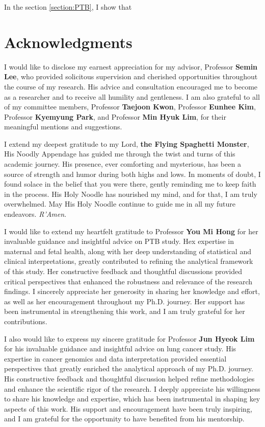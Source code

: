 \documentclass[11pt, a4paper, onecolumn, oneside]{report}
\begin{document}
        In the section \ref{section:PTB}, I show that
        \newpage

    
    
    \clearpage

    \section*{\hfill \Large Acknowledgments \hfill}
        I would like to disclose my earnest appreciation for my advisor, Professor \textbf{Semin Lee}, who provided solicitous supervision and cherished opportunities throughout the course of my research. His advice and consultation encouraged me to become as a researcher and to receive all humility and gentleness. I am also grateful to all of my committee members, Professor \textbf{Taejoon Kwon}, Professor \textbf{Eunhee Kim}, Professor \textbf{Kyemyung Park}, and Professor \textbf{Min Hyuk Lim}, for their meaningful mentions and suggestions.

        I extend my deepest gratitude to my Lord, \textbf{the Flying Spaghetti Monster}, His Noodly Appendage has guided me through the twist and turns of this academic journey. His presence, ever comforting and mysterious, has been a source of strength and humor during both highs and lows. In moments of doubt, I found solace in the belief that you were there, gently reminding me to keep faith in the process. His Holy Noodle has nourished my mind, and for that, I am truly overwhelmed. May His Holy Noodle continue to guide me in all my future endeavors. \textit{R'Amen}.

        I would like to extend my heartfelt gratitude to Professor \textbf{You Mi Hong} for her invaluable guidance and insightful advice on PTB study. Hex expertise in maternal and fetal health, along with her deep understanding of statistical and clinical interpretations, greatly contributed to refining the analytical framework of this study. Her constructive feedback and thoughtful discussions provided critical perspectives that enhanced the robustness and relevance of the research findings. I sincerely appreciate her generosity in sharing her knowledge and effort, as well as her encouragement throughout my Ph.D. journey. Her support has been instrumental in strengthening this work, and I am truly grateful for her contributions.

        I also would like to express my sincere gratitude for Professor \textbf{Jun Hyeok Lim} for his invaluable guidance and insightful advice on lung cancer study. His expertise in cancer genomics and data interpretation provided essential perspectives that greatly enriched the analytical approach of my Ph.D. journey. His constructive feedback and thoughtful discussion helped refine methodologies and enhance the scientific rigor of the research. I deeply appreciate his willingness to share his knowledge and expertise, which has been instrumental in shaping key aspects of this work. His support and encouragement have been truly inspiring, and I am grateful for the opportunity to have benefited from his mentorship.
\end{document}
